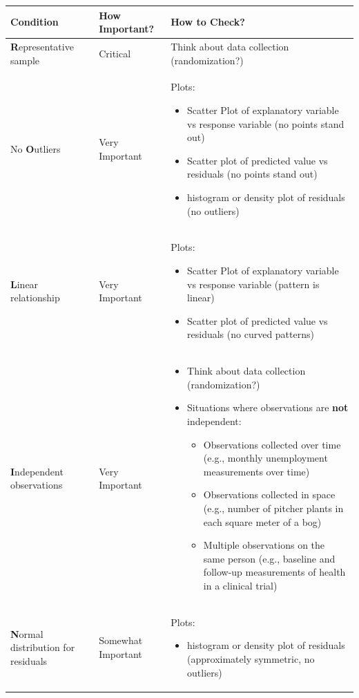 \documentclass[]{article}
\begin{document}
\begin{table}[htbp]
\centering
\begin{tabular}{p{} p{} p{}}
\toprule
Condition & How Important? & How to Check? \\
\midrule
\textbf{R}epresentative sample & Critical & Think about data collection (randomization?) \\
\midrule
No \textbf{O}utliers & Very Important & Plots: \begin{itemize} \item Scatter Plot of explanatory variable vs response variable (no points stand out) \item Scatter plot of predicted value vs residuals (no points stand out) \item histogram or density plot of residuals (no outliers) \end{itemize} \\
\midrule
\textbf{L}inear relationship & Very Important & Plots: \begin{itemize} \item Scatter Plot of explanatory variable vs response variable (pattern is linear) \item Scatter plot of predicted value vs residuals (no curved patterns) \end{itemize} \\
\midrule
\textbf{I}ndependent observations & Very Important & \begin{itemize} \item Think about data collection (randomization?) \item Situations where observations are \textbf{not} independent: \begin{itemize} \item Observations collected over time (e.g., monthly unemployment measurements over time) \item Observations collected in space (e.g., number of pitcher plants in each square meter of a bog) \item Multiple observations on the same person (e.g., baseline and follow-up measurements of health in a clinical trial) \end{itemize} \end{itemize} \\
\midrule
\textbf{N}ormal distribution for residuals & Somewhat Important & Plots: \begin{itemize} \item histogram or density plot of residuals (approximately symmetric, no outliers) \end{itemize} \\

\end{tabular}
\end{table}
\end{document}

